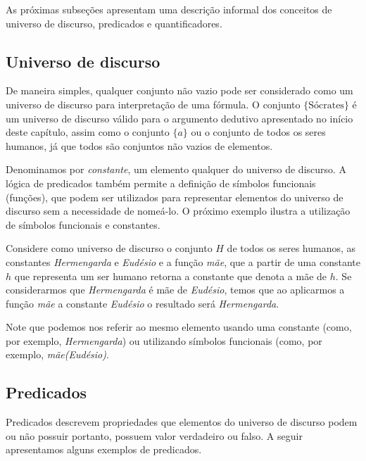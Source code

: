 As próximas subseções apresentam uma descrição informal dos conceitos
de universo de discurso, predicados e quantificadores.

\subsection{Universo de discurso}

De maneira simples, qualquer conjunto não vazio pode ser considerado
como um universo de discurso para interpretação de uma fórmula.
O conjunto $\{\text{Sócrates}\}$ é um universo de discurso válido para o
argumento dedutivo apresentado no início deste capítulo, assim como o
conjunto $\{a\}$ ou o conjunto de todos os seres humanos,
já que todos são conjuntos não vazios de elementos.

Denominamos por \textit{constante}, um elemento qualquer do
universo de discurso. A lógica de predicados também permite a
definição de símbolos funcionais (funções), que podem ser utilizados
para representar elementos do universo de discurso sem a necessidade
de nomeá-lo. O próximo exemplo ilustra a utilização de símbolos
funcionais e constantes.

\begin{Example}
Considere como universo de discurso o conjunto $H$ de todos os seres
humanos, as constantes \textit{Hermengarda} e \textit{Eudésio} e a
função \textit{mãe}, que a partir de uma constante $h$ que representa um
ser humano retorna a constante que denota a mãe de $h$. Se
considerarmos que \textit{Hermengarda} é mãe de \textit{Eudésio}, temos que ao
aplicarmos a função \textit{mãe} a constante \textit{Eudésio} o
resultado será \textit{Hermengarda}.

Note que podemos nos referir ao mesmo elemento usando uma constante
(como, por exemplo, \textit{Hermengarda}) ou utilizando símbolos
funcionais (como, por exemplo, \textit{mãe(Eudésio)}.
\end{Example}

\subsection{Predicados}

Predicados descrevem propriedades que elementos do universo de
discurso podem ou não possuir portanto, possuem valor verdadeiro ou
falso. A seguir apresentamos alguns exemplos de predicados.

